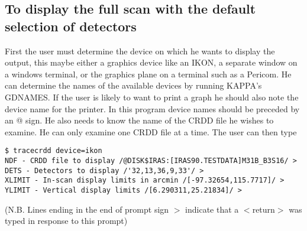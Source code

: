 \documentclass[twoside,11pt]{article}
\begin{document}
\subsection{To display the full scan with the default selection of detectors}
First the user must determine the device on which he wants to display the
output, this maybe either a graphics device like an IKON, a separate window on
a windows terminal, or the graphics plane on a terminal such as a Pericom. He
can determine the names of the available devices by running KAPPA's GDNAMES. If
the user is likely to want to print a graph he should also note the device name
for the printer. In this program device names should be preceded by an @ sign.
He also needs to know the name of the CRDD file he wishes to examine. He can
only examine one CRDD file at a time. The user can then type
\begin{small}
\begin{verbatim}
$ tracecrdd device=ikon
NDF - CRDD file to display /@DISK$IRAS:[IRAS90.TESTDATA]M31B_B3S16/ > 
DETS - Detectors to display /'32,13,36,9,33'/ > 
XLIMIT - In-scan display limits in arcmin /[-97.32654,115.7717]/ > 
YLIMIT - Vertical display limits /[6.290311,25.21834]/ > 
\end{verbatim}
\end{small}

(N.B. Lines ending in the end of prompt sign $>$ indicate that  a $<$return$>$
was typed in response to this prompt)
\end{document}

